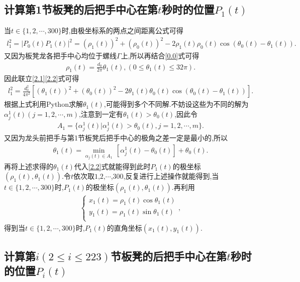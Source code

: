 \documentclass[lang=cn,newtx,10pt,scheme=chinese]{../Template/elegantbook}
\begin{document}
\subsection{计算第1节板凳的后把手中心在第\(t\)秒时的位置\(P_1(t)\)}\label{2.(1)}

当\(t\in \{ 1,2,\cdots ,300 \}\)时,由极坐标系的两点之间距离公式可得
\begin{align}
l_{1}^{2}=| P_0(t)P_1(t)|^2=(\rho _1(t))^2+(\rho _0(t))^2 - 2\rho _1(t)\rho _0(t)\cos (\theta _0(t)-\theta _1(t)) .\label{2.1} 
\end{align}
又因为板凳龙各把手中心均位于螺线\(\varGamma\)上,所以再结合\eqref{0.0}式可得
\begin{align}
\rho _1(t)=\frac{d_0}{2\pi}\theta _1(t),(0\leqslant \theta _1(t)\leqslant 32\pi) .\label{2.2}
\end{align}
因此联立\eqref{2.1}\eqref{2.2}式可得
\begin{align}
l_{1}^{2}=\frac{d_{0}^{2}}{4\pi ^2}[(\theta _1(t))^2+(\theta _0(t))^2 - 2\theta _1(t)\theta _0(t)\cos (\theta _0(t)-\theta _1(t))] .\label{2.0}
\end{align}
根据上式利用Python求解\(\theta _1(t)\),可能得到多个不同解.不妨设这些为不同的解为\(\alpha _{j}^{1}(t) (j = 1,2,\cdots ,m)\),注意到一定有\(\theta _1(t)>\theta _0(t)\),因此令
\begin{align}
A_1 = \{ \alpha _{j}^{1}(t) |\alpha _{j}^{1}(t) >\theta _0(t),j = 1,2,\cdots ,m \} .
\end{align}
又因为龙头前把手与第1节板凳后把手中心的极角之差一定是最小的,所以
\begin{align}
\theta _1(t)=\underset{\alpha _j(t)\in A_1}{\min}\,\left[ \alpha _{j}^{1}(t)-\theta _0\left( t \right) \right] +\theta _0\left( t \right) .
\end{align}
再将上述求得的\(\theta _1(t)\)代入\eqref{2.2}式就能得到此时\(P_1(t)\)的极坐标\((\rho _1(t),\theta _1(t))\).令\(t\)依次取\(1\),\(2\),\(\cdots\),\(300\),反复进行上述操作就能得到,当\(t\in \{ 1,2,\cdots ,300 \}\)时,\(P_1(t)\)的极坐标\((\rho _1(t),\theta _1(t))\).再利用
\begin{align}
\begin{cases}
x_1(t)=\rho _1(t)\cos \theta _1(t)\\
y_1(t)=\rho _1(t)\sin \theta _1(t)\\
\end{cases},    
\end{align}
得到当\(t\in \{ 1,2,\cdots ,300 \}\)时,\(P_1(t)\)的直角坐标\((x_1(t),y_1(t))\).

\subsection{计算第\(i(2\leqslant i\leqslant 223)\)节板凳的后把手中心在第\(t\)秒时的位置\(P_{i}(t)\)}\label{2.(2)}
\end{document}
